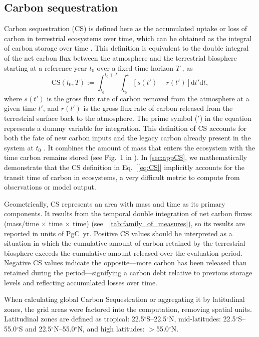 \documentclass[ProofPDF]{./Styles/Jnls-Template-V3}
\renewcommand{\eqref}[1]{Eq.~[\ref{#1}]}
\begin{document}
\subsection{Carbon sequestration} 
Carbon sequestration (CS) is defined here as the accumulated uptake or loss of carbon in terrestrial ecosystems over time, which can be obtained as the integral of carbon storage over time \citep{Sierra2021}. This definition is equivalent to the double integral of the net carbon flux between the atmosphere and the terrestrial biosphere starting at a reference year $t_0$ over a fixed time horizon $T$ \citep{Sierra2021,Metzler2024,Sierra2025}, as
\begin{equation} \label{eq:CS}
    \mbox{CS}\left(t_0,T\right):=\int^{t_0+T}_{t_0} \int^{t}_{t_0} \left[s(t')-r(t')\right]\mathrm{d}t'\mathrm{d}t,
\end{equation}
where $s(t')$ is the gross flux rate of carbon removed from the atmosphere at a given time $t'$, and $r(t')$ is the gross flux rate of carbon released from the terrestrial surface back to the atmosphere. The prime symbol ($'$) in the equation represents a dummy variable for integration. This definition of CS accounts for both the fate of new carbon inputs and the legacy carbon already present in the system at $t_0$ \citep{Metzler2024}. It combines the amount of mass that enters the ecosystem with the time carbon remains stored (see Fig.~1 in \citet{Munoz2024}). In \ref{sec:appCS}, we mathematically demonstrate that the CS definition in \eqref{eq:CS} implicitly accounts for the transit time of carbon in ecosystems, a very difficult metric to compute from observations or model output.

Geometrically, CS represents an area with mass and time as its primary components. It results from the temporal double integration of net carbon fluxes (mass/time $\times$ time $\times$ time) (see ~\ref{tab:family_of_measures}), so its results are reported in units of PgC~yr. Positive CS values should be interpreted as a situation in which the cumulative amount of carbon retained by the terrestrial biosphere exceeds the cumulative amount released over the evaluation period. Negative CS values indicate the opposite—more carbon has been released than retained during the period—signifying a carbon debt relative to previous storage levels and reflecting accumulated losses over time.

When calculating global Carbon Sequestration or aggregating it by latitudinal zones, the grid areas were factored into the computation, removing spatial units. Latitudinal zones are defined as tropical: 22.5$^\circ$S--22.5$^\circ$N, mid-latitudes: 22.5$^\circ$S--55.0$^\circ$S and 22.5$^\circ$N--55.0$^\circ$N, and high latitudes: $>$55.0$^\circ$N.
\end{document}
